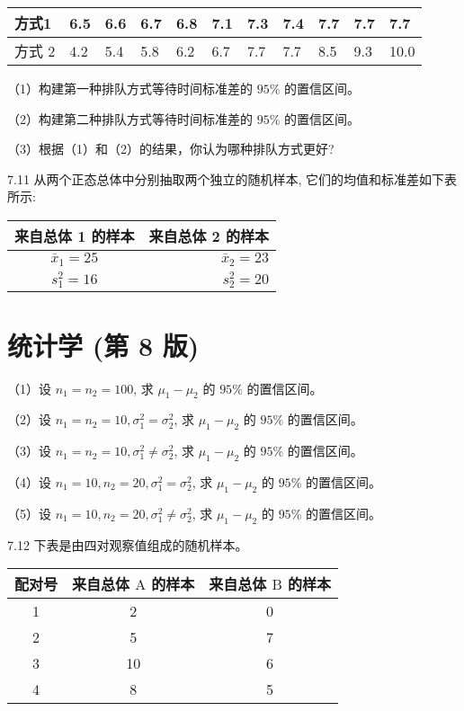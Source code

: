 \documentclass[10pt]{article}
\begin{document}
\begin{CJK*}{UTF8}{bsmi}
\begin{center}
\begin{tabular}{lllllllllll}
\hline
方式1 & 6.5 & 6.6 & 6.7 & 6.8 & 7.1 & 7.3 & 7.4 & 7.7 & 7.7 & 7.7 \\
\hline
方式 2 & 4.2 & 5.4 & 5.8 & 6.2 & 6.7 & 7.7 & 7.7 & 8.5 & 9.3 & 10.0 \\
\hline
\end{tabular}
\end{center}

（1）构建第一种排队方式等待时间标准差的 $95 \%$ 的置信区间。

（2）构建第二种排队方式等待时间标准差的 $95 \%$ 的置信区间。

（3）根据（1）和（2）的结果，你认为哪种排队方式更好?

7.11 从两个正态总体中分别抽取两个独立的随机样本, 它们的均值和标准差如下表所示:

\begin{center}
\begin{tabular}{cr}
\hline
来自总体 1 的样本 & 来自总体 2 的样本 \\
\hline
$\bar{x}_{1}=25$ & $\bar{x}_{2}=23$ \\
$s_{1}^{2}=16$ & $s_{2}^{2}=20$ \\
\end{tabular}
\end{center}

\section*{统计学 (第 8 版)}
（1）设 $n_{1}=n_{2}=100$, 求 $\mu_{1}-\mu_{2}$ 的 $95 \%$ 的置信区间。

（2）设 $n_{1}=n_{2}=10, \sigma_{1}^{2}=\sigma_{2}^{2}$, 求 $\mu_{1}-\mu_{2}$ 的 $95 \%$ 的置信区间。

（3）设 $n_{1}=n_{2}=10, \sigma_{1}^{2} \neq \sigma_{2}^{2}$, 求 $\mu_{1}-\mu_{2}$ 的 $95 \%$ 的置信区间。

（4）设 $n_{1}=10, n_{2}=20, \sigma_{1}^{2}=\sigma_{2}^{2}$, 求 $\mu_{1}-\mu_{2}$ 的 $95 \%$ 的置信区间。

（5）设 $n_{1}=10, n_{2}=20, \sigma_{1}^{2} \neq \sigma_{2}^{2}$, 求 $\mu_{1}-\mu_{2}$ 的 $95 \%$ 的置信区间。

7.12 下表是由四对观察值组成的随机样本。

\begin{center}
\begin{tabular}{ccc}
\hline
配对号 & 来自总体 $\mathrm{A}$ 的样本 & 来自总体 $\mathrm{B}$ 的样本 \\
\hline
1 & 2 & 0 \\
2 & 5 & 7 \\
3 & 10 & 6 \\
4 & 8 & 5 \\
\hline
\end{tabular}
\end{center}


\end{CJK*}
\end{document}
